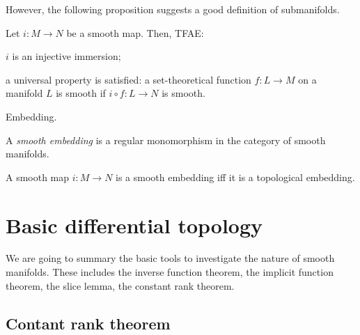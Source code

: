 \documentclass{../note}
\begin{document}
However, the following proposition suggests a good definition of submanifolds.
\begin{prop}
Let $i:M\to N$ be a smooth map.
Then, TFAE:
\begin{parts}
\item $i$ is an injective immersion;
\item a universal property is satisfied: a set-theoretical function $f:L\to M$ on a manifold $L$ is smooth if $i\circ f:L\to N$ is smooth.
\end{parts}
\end{prop}


Embedding.

\begin{defn}
A \emph{smooth embedding} is a regular monomorphism in the category of smooth manifolds.
\end{defn}
\begin{prop}
A smooth map $i:M\to N$ is a smooth embedding iff it is a topological embedding.
\end{prop}










\section{Basic differential topology}
We are going to summary the basic tools to investigate the nature of smooth manifolds.
These includes the inverse function theorem, the implicit function theorem, the slice lemma, the constant rank theorem.


\subsection{Contant rank theorem}
\end{document}
